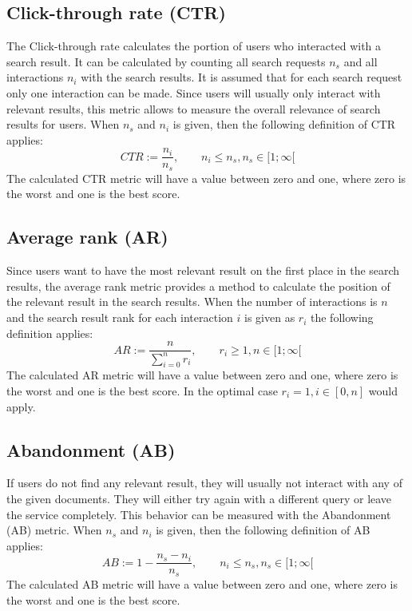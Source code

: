 \subsection{Click-through rate (CTR)}
The Click-through rate calculates the portion of users who interacted with a search result.
It can be calculated by counting all search requests $n_s$ and all interactions $n_i$ with the search results.
It is assumed that for each search request only one interaction can be made.
Since users will usually only interact with relevant results, 
this metric allows to measure the overall relevance of search results for users.
When $n_s$ and $n_i$ is given, then the following definition of CTR applies:
\begin{equation}
	CTR := \frac{n_i}{n_s}, \qquad n_i \leq n_s, n_s \in [1;\infty[
\end{equation}
The calculated CTR metric will have a value between zero and one, where zero is the worst and one is the best score.

\subsection{Average rank (AR)}
Since users want to have the most relevant result on the first place in the search results, 
the average rank metric provides a method to calculate the position of the relevant result in the search results.
When the number of interactions is $n$ and the search result rank for each interaction $i$ is given as $r_i$
the following definition applies:
\begin{equation}
	AR := \frac{n}{\sum_{i=0}^n r_i}, \qquad r_i \geq 1, n \in [1;\infty[
\end{equation}
The calculated AR metric will have a value between zero and one, where zero is the worst and one is the best score.
In the optimal case $r_i=1,i\in[0,n]$ would apply.
		
\subsection{Abandonment (AB)}
If users do not find any relevant result, they will usually not interact with any of the given documents.
They will either try again with a different query or leave the service completely.
This behavior can be measured with the Abandonment (AB) metric.
When $n_s$ and $n_i$ is given, then the following definition of AB applies:
\begin{equation}
	AB := 1 - \frac{n_s - n_i}{n_s}, \qquad n_i \leq n_s, n_s \in [1;\infty[
\end{equation}
The calculated AB metric will have a value between zero and one, where zero is the worst and one is the best score.
		

